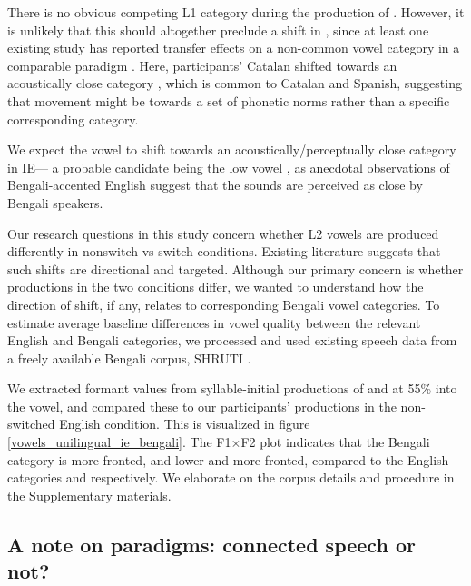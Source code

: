 \documentclass[12 pt]{article}
\newcommand{\nt}[1]{\textipa{[#1]}} %
\begin{document}

There is no obvious competing L1 category during the production of \nt{2}. However, it is unlikely that this should altogether preclude a shift in \nt{2}, since at least one existing study has reported transfer effects on a non-common vowel category in a comparable paradigm \citep{simonet2014phonetic}. Here, participants' Catalan \nt{O} shifted towards an acoustically close category \nt{o}, which is common to Catalan and Spanish, suggesting that movement might be towards a set of phonetic norms rather than a specific corresponding category. 

We expect the vowel \nt{2} to shift towards an acoustically/perceptually close category in IE--- a probable candidate being the low vowel \nt{a:}, as anecdotal observations of Bengali-accented English suggest that the sounds are perceived as close by Bengali speakers. 


Our research questions in this study concern whether L2 vowels are produced differently in nonswitch vs switch conditions. Existing literature suggests that such shifts are directional and targeted. Although our primary concern is whether productions in the two conditions differ, we wanted to understand how the direction of shift, if any, relates to corresponding Bengali vowel categories. To estimate average baseline differences in vowel quality between the relevant English and Bengali categories, we processed and used existing speech data from a freely available Bengali corpus, SHRUTI \citep{shruticorpus}. 

We extracted formant values from syllable-initial productions of \nt{\ae} and \nt{a:} at 55\% into the vowel, and compared these to our participants' productions in the non-switched English condition. This is visualized in figure \ref{vowels_unilingual_ie_bengali}. 
The F1$\times$F2 plot indicates that the Bengali category \nt{\ae} is more fronted, and \nt{a:} lower and more fronted, compared to the English categories \nt{\ae} and \nt{2} respectively. We elaborate on the corpus details and procedure in the Supplementary materials.

\subsection{A note on paradigms: connected speech or not?} \label{paradigms}
\end{document}
